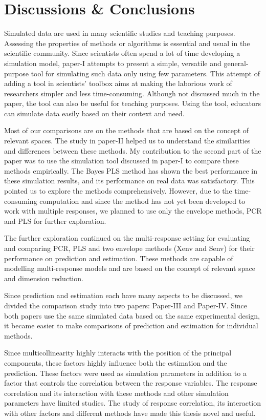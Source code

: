 \documentclass[11pt,twoside,openright,titlepage,
  headinclude,footinclude,BCOR=5mm,
  numbers=noenddot,cleardoublepage=empty,
  tablecaptionabove, dottedtoc,
  bibliography=totoc,paper=a4]{scrreprt}
\begin{document}
\hypertarget{discussions-conclusions}{%
\chapter{Discussions \& Conclusions}\label{discussions-conclusions}}

Simulated data are used in many scientific studies and teaching purposes. Assessing the properties of methods or algorithms is essential and usual in the scientific community. Since scientists often spend a lot of time developing a simulation model, paper-I attempts to present a simple, versatile and general-purpose tool for simulating such data only using few parameters. This attempt of adding a tool in scientists' toolbox aims at making the laborious work of researchers simpler and less time-consuming. Although not discussed much in the paper, the tool can also be useful for teaching purposes. Using the tool, educators can simulate data easily based on their context and need.

Most of our comparisons are on the methods that are based on the concept of relevant spaces. The study in paper-II helped us to understand the similarities and differences between these methods. My contribution to the second part of the paper was to use the simulation tool discussed in paper-I to compare these methods empirically. The Bayes PLS method has shown the best performance in these simulation results, and its performance on real data was satisfactory. This pointed us to explore the methods comprehensively. However, due to the time-consuming computation and since the method has not yet been developed to work with multiple responses, we planned to use only the envelope methods, PCR and PLS for further exploration.

The further exploration continued on the multi-response setting for evaluating and comparing PCR, PLS and two envelope methods (Xenv and Senv) for their performance on prediction and estimation. These methods are capable of modelling multi-response models and are based on the concept of relevant space and dimension reduction.

Since prediction and estimation each have many aspects to be discussed, we divided the comparison study into two papers: Paper-III and Paper-IV. Since both papers use the same simulated data based on the same experimental design, it became easier to make comparisons of prediction and estimation for individual methods.

Since multicollinearity highly interacts with the position of the principal components, these factors highly influence both the estimation and the prediction. These factors were used as simulation parameters in addition to a factor that controls the correlation between the response variables. The response correlation and its interaction with these methods and other simulation parameters have limited studies. The study of response correlation, its interaction with other factors and different methods have made this thesis novel and useful.
\end{document}
